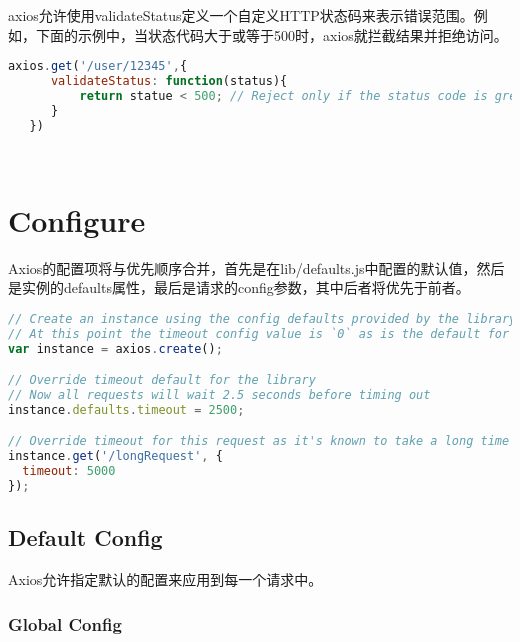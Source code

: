 axios允许使用validateStatus定义一个自定义HTTP状态码来表示错误范围。例如，下面的示例中，当状态代码大于或等于500时，axios就拦截结果并拒绝访问。

\begin{lstlisting}[language=JavaScript]
axios.get('/user/12345',{
      validateStatus: function(status){
          return statue < 500; // Reject only if the status code is greater than or equal to 500
      }
   })
\end{lstlisting}






\begin{lstlisting}[language=JavaScript]

\end{lstlisting}



\begin{lstlisting}[language=JavaScript]

\end{lstlisting}




\chapter{Configure}


Axios的配置项将与优先顺序合并，首先是在lib/defaults.js中配置的默认值，然后是实例的defaults属性，最后是请求的config参数，其中后者将优先于前者。 


\begin{lstlisting}[language=JavaScript]
// Create an instance using the config defaults provided by the library
// At this point the timeout config value is `0` as is the default for the library
var instance = axios.create();

// Override timeout default for the library
// Now all requests will wait 2.5 seconds before timing out
instance.defaults.timeout = 2500;

// Override timeout for this request as it's known to take a long time
instance.get('/longRequest', {
  timeout: 5000
});
\end{lstlisting}


\section{Default Config}

Axios允许指定默认的配置来应用到每一个请求中。

\subsection{Global Config}



